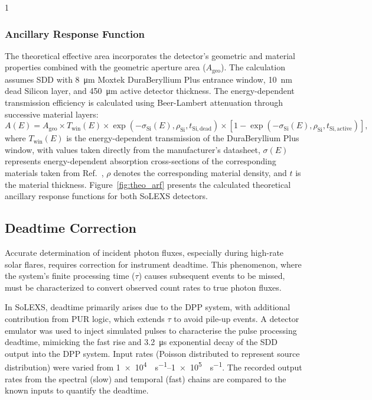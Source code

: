 \documentclass[12pt]{spieman}  %
\begin{document}
\begin{spacing}{1}
\subsubsection{Ancillary Response Function}
The theoretical effective area incorporates the detector's geometric and material properties combined with the geometric aperture area ($A_{\mathrm{geo}}$). 
The calculation assumes SDD with \SI{8}{\micro\metre} Moxtek DuraBeryllium Plus entrance window, \SI{10}{\nano\metre} dead Silicon layer, and \SI{450}{\micro\metre} active detector thickness. 
The energy-dependent transmission efficiency is calculated using Beer-Lambert attenuation through successive material layers:
\begin{equation}
A(E) = A_{\mathrm{geo}} \times T_{\mathrm{win}}(E) \times
\exp\left(-\sigma_{\mathrm{Si}}(E), \rho_{\mathrm{Si}}, t_{\mathrm{Si,dead}}\right) \times
\left[1 - \exp\left(-\sigma_{\mathrm{Si}}(E), \rho_{\mathrm{Si}}, t_{\mathrm{Si,active}}\right)\right],
\label{eq:arf_updated}
\end{equation}
where $T_{\mathrm{win}}(E)$ is the energy-dependent transmission of the DuraBeryllium Plus window, with values taken directly from the manufacturer's datasheet\footnotemark[2], $\sigma(E)$ represents energy-dependent absorption cross-sections of the corresponding materials taken from Ref.~, $\rho$ denotes the corresponding material density, and $t$ is the material thickness. Figure~\ref{fig:theo_arf} presents the calculated theoretical ancillary response functions for both SoLEXS detectors.

\subsection{Deadtime Correction}

Accurate determination of incident photon fluxes, especially during high-rate solar flares, requires correction for instrument deadtime. This phenomenon, where the system's finite processing time ($\tau$) causes subsequent events to be missed, must be characterized to convert observed count rates to true photon fluxes.

In SoLEXS, deadtime primarily arises due to the DPP system, with additional contribution from PUR logic, which extends $\tau$ to avoid pile-up events. 
A detector emulator was used to inject simulated pulses to characterise the pulse processing deadtime, mimicking the fast rise and \SI{3.2}{\micro\second} exponential decay of the SDD output into the DPP system. Input rates (Poisson distributed to represent source distribution) were varied from \SIrange{1e4}{1e5}{\counts\per\second}. The recorded output rates from the spectral (slow) and temporal (fast) chains are compared to the known inputs to quantify the deadtime.


\end{spacing}
\end{document}
